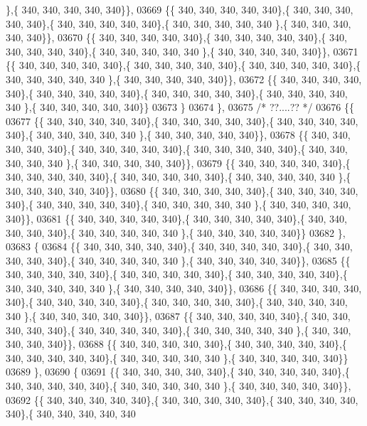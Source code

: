 \begin{DoxyCode}
      \},\{ 340, 340, 340, 340, 340\}\},
03669 \{\{ 340, 340, 340, 340, 340\},\{ 340, 340, 340, 340, 340\},\{ 340, 340, 340, 340, 340\},\{ 340, 340, 340, 340, 340
      \},\{ 340, 340, 340, 340, 340\}\},
03670 \{\{ 340, 340, 340, 340, 340\},\{ 340, 340, 340, 340, 340\},\{ 340, 340, 340, 340, 340\},\{ 340, 340, 340, 340, 340
      \},\{ 340, 340, 340, 340, 340\}\},
03671 \{\{ 340, 340, 340, 340, 340\},\{ 340, 340, 340, 340, 340\},\{ 340, 340, 340, 340, 340\},\{ 340, 340, 340, 340, 340
      \},\{ 340, 340, 340, 340, 340\}\},
03672 \{\{ 340, 340, 340, 340, 340\},\{ 340, 340, 340, 340, 340\},\{ 340, 340, 340, 340, 340\},\{ 340, 340, 340, 340, 340
      \},\{ 340, 340, 340, 340, 340\}\}
03673 \}
03674 \},
03675 \textcolor{comment}{/* ??....?? */}
03676 \{\{
03677 \{\{ 340, 340, 340, 340, 340\},\{ 340, 340, 340, 340, 340\},\{ 340, 340, 340, 340, 340\},\{ 340, 340, 340, 340, 340
      \},\{ 340, 340, 340, 340, 340\}\},
03678 \{\{ 340, 340, 340, 340, 340\},\{ 340, 340, 340, 340, 340\},\{ 340, 340, 340, 340, 340\},\{ 340, 340, 340, 340, 340
      \},\{ 340, 340, 340, 340, 340\}\},
03679 \{\{ 340, 340, 340, 340, 340\},\{ 340, 340, 340, 340, 340\},\{ 340, 340, 340, 340, 340\},\{ 340, 340, 340, 340, 340
      \},\{ 340, 340, 340, 340, 340\}\},
03680 \{\{ 340, 340, 340, 340, 340\},\{ 340, 340, 340, 340, 340\},\{ 340, 340, 340, 340, 340\},\{ 340, 340, 340, 340, 340
      \},\{ 340, 340, 340, 340, 340\}\},
03681 \{\{ 340, 340, 340, 340, 340\},\{ 340, 340, 340, 340, 340\},\{ 340, 340, 340, 340, 340\},\{ 340, 340, 340, 340, 340
      \},\{ 340, 340, 340, 340, 340\}\}
03682 \},
03683 \{
03684 \{\{ 340, 340, 340, 340, 340\},\{ 340, 340, 340, 340, 340\},\{ 340, 340, 340, 340, 340\},\{ 340, 340, 340, 340, 340
      \},\{ 340, 340, 340, 340, 340\}\},
03685 \{\{ 340, 340, 340, 340, 340\},\{ 340, 340, 340, 340, 340\},\{ 340, 340, 340, 340, 340\},\{ 340, 340, 340, 340, 340
      \},\{ 340, 340, 340, 340, 340\}\},
03686 \{\{ 340, 340, 340, 340, 340\},\{ 340, 340, 340, 340, 340\},\{ 340, 340, 340, 340, 340\},\{ 340, 340, 340, 340, 340
      \},\{ 340, 340, 340, 340, 340\}\},
03687 \{\{ 340, 340, 340, 340, 340\},\{ 340, 340, 340, 340, 340\},\{ 340, 340, 340, 340, 340\},\{ 340, 340, 340, 340, 340
      \},\{ 340, 340, 340, 340, 340\}\},
03688 \{\{ 340, 340, 340, 340, 340\},\{ 340, 340, 340, 340, 340\},\{ 340, 340, 340, 340, 340\},\{ 340, 340, 340, 340, 340
      \},\{ 340, 340, 340, 340, 340\}\}
03689 \},
03690 \{
03691 \{\{ 340, 340, 340, 340, 340\},\{ 340, 340, 340, 340, 340\},\{ 340, 340, 340, 340, 340\},\{ 340, 340, 340, 340, 340
      \},\{ 340, 340, 340, 340, 340\}\},
03692 \{\{ 340, 340, 340, 340, 340\},\{ 340, 340, 340, 340, 340\},\{ 340, 340, 340, 340, 340\},\{ 340, 340, 340, 340, 340

\end{DoxyCode}
